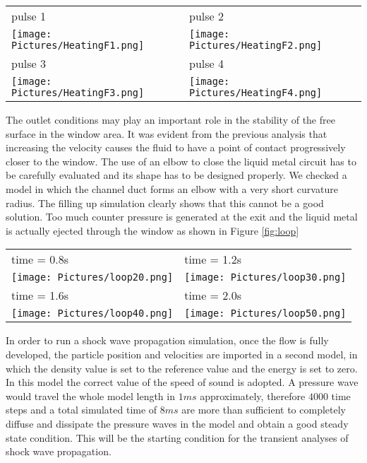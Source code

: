 \documentclass[a4paper, 11pt, twocolumn]{article}
\begin{document}
\begin{figure*}[t]
\centering
\begin{tabular}{|l|l|}
\hline
\small pulse 1 & \small pulse 2 \\
\texttt{[image: Pictures/HeatingF1.png]} &
\texttt{[image: Pictures/HeatingF2.png]} \\
\hline
\small pulse 3 & \small pulse 4 \\
\texttt{[image: Pictures/HeatingF3.png]} &
\texttt{[image: Pictures/HeatingF4.png]} \\
\hline
\end{tabular}
\caption{Target heating with double mass flow rate. The specific energy of $9 kJ/kg$ causes a temperature rise of $62 K$}
\label{fig:heating2}
\end{figure*}

The outlet conditions may play an important role in the stability of the free surface in the window area. It was evident from the previous analysis that increasing the velocity causes the fluid to have a point of contact progressively closer to the window. The use of an elbow to close the liquid metal circuit has to be carefully evaluated and its shape has to be designed properly. We checked a model in which the channel duct forms an elbow with a very short curvature radius. The filling up simulation clearly shows that this cannot be a good solution. Too much counter pressure is generated at the exit and the liquid metal is actually ejected through the window as shown in Figure \ref{fig:loop}

\begin{figure*}[t]
\centering
\begin{tabular}{|l|l|}
\hline
\small time = 0.8s & \small time = 1.2s\\
\texttt{[image: Pictures/loop20.png]} &
\texttt{[image: Pictures/loop30.png]} \\
\hline
\small time = 1.6s & \small time = 2.0s\\
\texttt{[image: Pictures/loop40.png]} &
\texttt{[image: Pictures/loop50.png]} \\
\hline
\end{tabular}
\caption{Particle velocity in the target when an elbow with an high curvature is adopted at the outlet}
\label{fig:loop}
\end{figure*}

In order to run a shock wave propagation simulation, once the flow is fully developed, the particle position and velocities are imported in a second model, in which the density value is set to the reference value and the energy is set to zero. In this model the correct value of the speed of sound is adopted. A pressure wave would travel the whole model length in $1ms$ approximately, therefore $4000$ time steps and a total simulated time of $8ms$ are more than sufficient to completely diffuse and dissipate the pressure waves in the model and obtain a good steady state condition. This will be the starting condition for the transient analyses of shock wave propagation.
\end{document}
